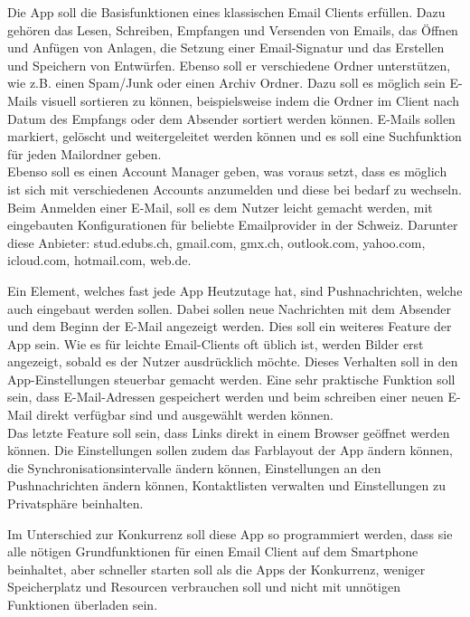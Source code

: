 \documentclass[a4paper,11pt]{article}
\begin{document}
Die App soll die Basisfunktionen eines klassischen Email Clients erfüllen. Dazu gehören das Lesen, Schreiben, Empfangen und Versenden von Emails, 
das Öffnen und Anfügen von Anlagen, die Setzung einer Email-Signatur und das Erstellen und Speichern von Entwürfen. 
Ebenso soll er verschiedene Ordner unterstützen, wie z.B. einen Spam/Junk oder einen Archiv Ordner. 
Dazu soll es möglich sein E-Mails visuell sortieren zu können, beispielsweise indem die Ordner im Client nach Datum des Empfangs oder dem Absender sortiert werden können. E-Mails sollen markiert, gelöscht und weitergeleitet werden können und es soll eine Suchfunktion für jeden Mailordner geben. \\

Ebenso soll es einen Account Manager geben, was voraus setzt, dass es möglich ist sich mit verschiedenen 
Accounts anzumelden und diese bei bedarf zu wechseln. Beim Anmelden einer E-Mail, soll es dem Nutzer leicht gemacht werden, mit eingebauten Konfigurationen für beliebte 
Emailprovider in der Schweiz. Darunter diese Anbieter: stud.edubs.ch, gmail.com, gmx.ch, outlook.com, yahoo.com, icloud.com, hotmail.com, web.de. 

\newpage

Ein Element, welches fast jede App Heutzutage hat, sind Pushnachrichten, welche auch eingebaut werden sollen. Dabei sollen neue Nachrichten mit dem Absender und dem Beginn der E-Mail angezeigt werden. 
Dies soll ein weiteres Feature der App sein. Wie es für leichte Email-Clients oft üblich ist, werden Bilder erst angezeigt, sobald es der Nutzer ausdrücklich möchte. Dieses Verhalten soll in den App-Einstellungen steuerbar gemacht werden. Eine sehr praktische Funktion soll sein, dass E-Mail-Adressen gespeichert werden und beim schreiben einer neuen E-Mail direkt verfügbar sind und ausgewählt werden können. %
\\

Das letzte Feature soll sein, dass Links direkt in einem Browser geöffnet werden können. Die Einstellungen sollen zudem das Farblayout der App ändern können, die Synchronisationsintervalle ändern können, Einstellungen an den Pushnachrichten ändern können, Kontaktlisten verwalten und Einstellungen zu Privatsphäre beinhalten.


Im Unterschied zur Konkurrenz soll diese App so programmiert werden, dass sie alle nötigen Grundfunktionen für einen Email Client auf dem Smartphone beinhaltet, aber schneller starten soll als die Apps der Konkurrenz, weniger Speicherplatz und Resourcen verbrauchen soll und nicht mit unnötigen Funktionen überladen sein. \\
\end{document}
